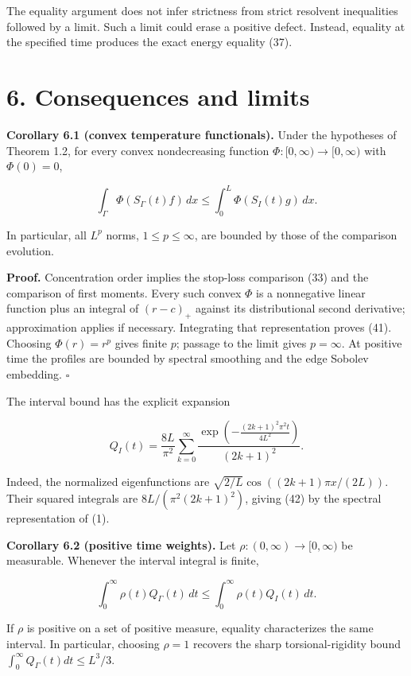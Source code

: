 \documentclass[11pt]{article}
\begin{document}
The equality argument does not infer strictness from strict resolvent
inequalities followed by a limit. Such a limit could erase a positive
defect. Instead, equality at the specified time produces the exact
energy equality (37).

\section{6. Consequences and limits}\label{consequences-and-limits}

\textbf{Corollary 6.1 (convex temperature functionals).} Under the
hypotheses of Theorem 1.2, for every convex nondecreasing function
\(\Phi:[0,\infty)\to[0,\infty)\) with \(\Phi(0)=0\),

\[
\int_\Gamma\Phi(S_\Gamma(t)f)\,dx
\le\int_0^L\Phi(S_I(t)g)\,dx.
\tag{41}
\]

In particular, all \(L^p\) norms, \(1\le p\le\infty\), are bounded by
those of the comparison evolution.

\textbf{Proof.} Concentration order implies the stop-loss comparison
(33) and the comparison of first moments. Every such convex \(\Phi\) is
a nonnegative linear function plus an integral of \((r-c)_+\) against
its distributional second derivative; approximation applies if
necessary. Integrating that representation proves (41). Choosing
\(\Phi(r)=r^p\) gives finite \(p\); passage to the limit gives
\(p=\infty\). At positive time the profiles are bounded by spectral
smoothing and the edge Sobolev embedding. \(\square\)

The interval bound has the explicit expansion

\[
Q_I(t)=\frac{8L}{\pi^2}\sum_{k=0}^{\infty}
\frac{\exp\!\left(-\frac{(2k+1)^2\pi^2t}{4L^2}\right)}{(2k+1)^2}.
\tag{42}
\]

Indeed, the normalized eigenfunctions are
\(\sqrt{2/L}\cos((2k+1)\pi x/(2L))\). Their squared integrals are
\(8L/(\pi^2(2k+1)^2)\), giving (42) by the spectral representation of
(1).

\textbf{Corollary 6.2 (positive time weights).} Let
\(\rho:(0,\infty)\to[0,\infty)\) be measurable. Whenever the interval
integral is finite,

\[
\int_0^\infty\rho(t)Q_\Gamma(t)\,dt
\le\int_0^\infty\rho(t)Q_I(t)\,dt.
\tag{43}
\]

If \(\rho\) is positive on a set of positive measure, equality
characterizes the same interval. In particular, choosing \(\rho=1\)
recovers the sharp torsional-rigidity bound
\(\int_0^\infty Q_\Gamma(t)dt\le L^3/3\).
\end{document}
